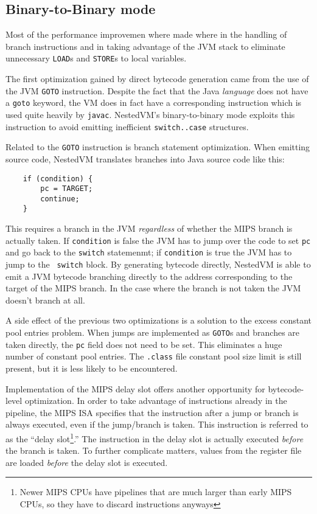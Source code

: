 \documentclass{acmconf}
\begin{document}
\subsection{Binary-to-Binary mode}

Most of the performance improvemen where made where in the handling of
branch instructions and in taking advantage of the JVM stack to
eliminate unnecessary {\tt LOAD}s and {\tt STORE}s to local variables.


The first optimization gained by direct bytecode generation came from
the use of the JVM {\tt GOTO} instruction.  Despite the fact that the
Java {\it language} does not have a {\tt goto} keyword, the VM does in
fact have a corresponding instruction which is used quite heavily by
{\tt javac}.  NestedVM's binary-to-binary mode exploits this
instruction to avoid emitting inefficient {\tt switch..case}
structures.

Related to the {\tt GOTO} instruction is branch statement
optimization.  When emitting source code, NestedVM translates branches
into Java source code like this:

{\footnotesize\begin{verbatim}
    if (condition) {
        pc = TARGET;
        continue;
    }
\end{verbatim}}

This requires a branch in the JVM {\it regardless} of whether the MIPS
branch is actually taken.  If {\tt condition} is false the JVM has to
jump over the code to set {\tt pc} and go back to the {\tt switch}
statemenmt; if {\tt condition} is true the JVM has to jump to the {\tt
switch} block.  By generating bytecode directly, NestedVM is able to
emit a JVM bytecode branching directly to the address corresponding to
the target of the MIPS branch.  In the case where the branch is not
taken the JVM doesn't branch at all.

A side effect of the previous two optimizations is a solution to the
excess constant pool entries problem.  When jumps are implemented as
{\tt GOTO}s and branches are taken directly, the {\tt pc} field does
not need to be set.  This eliminates a huge number of constant pool
entries.  The {\tt .class} file constant pool size limit is still
present, but it is less likely to be encountered.

Implementation of the MIPS delay slot offers another opportunity for
bytecode-level optimization.  In order to take advantage of
instructions already in the pipeline, the MIPS ISA specifies that the
instruction after a jump or branch is always executed, even if the
jump/branch is taken.  This instruction is referred to as the ``delay
slot\footnote{Newer MIPS CPUs have pipelines that are much larger than
early MIPS CPUs, so they have to discard instructions anyways}.''  The
instruction in the delay slot is actually executed {\it before} the
branch is taken.  To further complicate matters, values from the
register file are loaded {\it before} the delay slot is executed.
\end{document}
